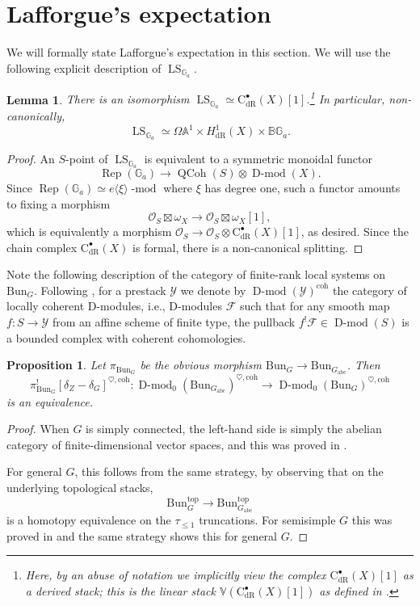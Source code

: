 \documentclass[11pt]{amsart}
\newcommand{\bG}{\mathbb{G}}
\newcommand{\B}{\mathbb{B}}
\newcommand{\bA}{\mathbb{A}}
\newcommand{\cF}{\mathcal{F}}
\newcommand{\cC}{{\mathrm C}}
\newcommand{\cY}{{\mathcal Y}}
\newcommand{\cO}{{\mathcal O}}
\newcommand{\dR}{\mathrm{dR}}
\newcommand{\Rep}{\operatorname{Rep}}
\newcommand{\Bun}{{\mathrm{Bun}}}
\newcommand{\abc}{{\mathrm{abc}}}
\DeclareMathOperator{\QCoh}{QCoh}
\DeclareMathOperator{\Dmod}{D-mod}
\DeclareMathOperator{\LS}{LS}
\newtheorem{lemma}[thm]{Lemma}
\newtheorem{prop}[thm]{Proposition}
\theoremstyle{remark}
\theoremstyle{definition}
\begin{document}
\section{Lafforgue's expectation}\label{sec:lafforgue-expectation}
We will formally state Lafforgue's expectation in this section. We will use the following explicit description of $\LS_{\bG_a}$.
\begin{lemma}\label{lem:LS_Ga}
    There is an isomorphism $\LS_{\bG_a}\simeq\cC^\bullet_\dR(X)[1]$.\footnote{Here, by an abuse of notation we implicitly view the complex $\cC^\bullet_\dR(X)[1]$ as a derived stack; this is the \emph{linear stack} $\mathbb V(\cC^\bullet_\dR(X)[1])$ as defined in \cite[\S3.2]{toen}.}
    In particular, non-canonically, \[\LS_{\bG_a}\simeq\Omega\bA^1\times H^1_\dR(X)\times\B\bG_a.\]
\end{lemma}
\begin{proof}
    An $S$-point of $\LS_{\bG_a}$ is equivalent to a symmetric monoidal functor
    \[
    \Rep(\bG_a)\to \QCoh(S)\otimes\Dmod(X).
    \]
    Since $\Rep(\bG_a)\simeq e\langle\xi\rangle\operatorname{-mod}$ where $\xi$ has degree one, such a functor amounts to fixing a morphism
    \[
    \cO_S\boxtimes\omega_X\to\cO_S\boxtimes\omega_X[1],
    \]
    which is equivalently a morphism $\cO_S\to \cO_S\otimes\cC_\dR^\bullet(X)[1]$,
    as desired. 
    Since the chain complex $\cC^\bullet_\dR(X)$ is formal, there is a non-canonical splitting.
\end{proof}
Note the following description of the category of finite-rank local systems on $\Bun_G$. Following \cite[\S4.1.1]{quasi-temp}, for a prestack $\cY$ we denote by $\Dmod(\cY)^{\mathrm{coh}}$ the category of locally coherent D-modules, i.e., D-modules $\cF$ such that for any smooth map $f\colon S\to\cY$ from an affine scheme of finite type, the pullback $f^!\cF\in\Dmod(S)$ is a bounded complex with coherent cohomologies.
\begin{prop}\label{prop:fin-rank-local-systems}
    Let $\pi_{\Bun_G}$ be the obvious morphism $\Bun_G\to\Bun_{G_\abc}$. Then
    \[
    \pi_{\Bun_G}^![\delta_Z-\delta_G]^{\heartsuit,\mathrm{coh}}\colon\Dmod_0(\Bun_{G_\abc})^{\heartsuit,\mathrm{coh}}\to\Dmod_0(\Bun_G)^{\heartsuit,\mathrm{coh}}
    \]
    is an equivalence. 
\end{prop}
\begin{proof}
    When $G$ is simply connected, the left-hand side is simply the abelian category of finite-dimensional vector spaces, and this was proved in \cite[Proposition~4.1.4.1]{quasi-temp}. 

For general $G$, this follows from the same strategy, by observing that on the underlying topological stacks,
    \[
    \Bun_G^{\mathrm{top}}\to\Bun_{G_\abc}^{\mathrm{top}}
    \]
    is a homotopy equivalence on the $\tau_{\le1}$ truncations. For semisimple $G$ this was proved in \cite[Proposition~4.1.6]{GLC5} and the same strategy shows this for general $G$.
\end{proof}
\end{document}
